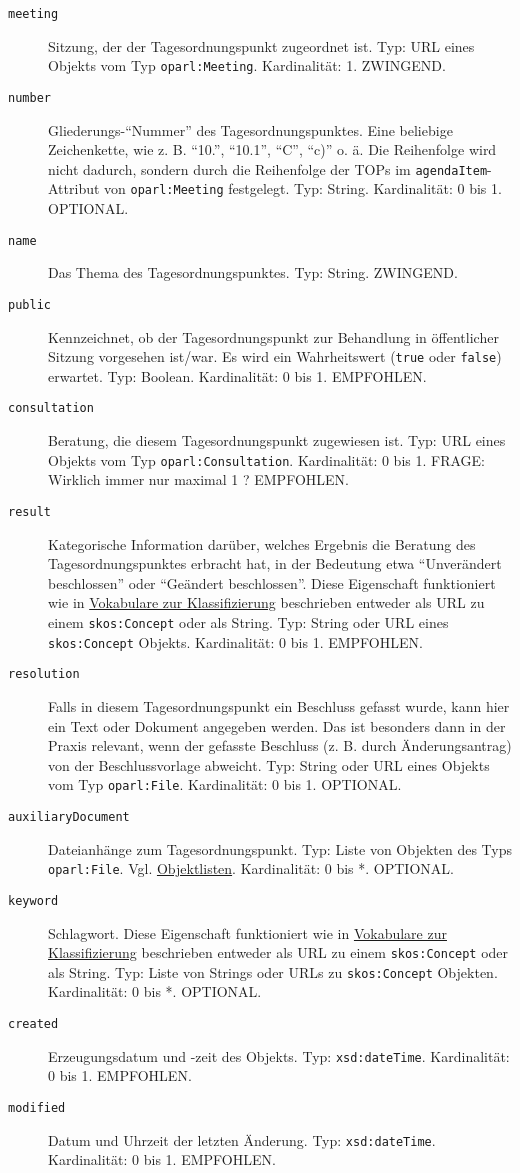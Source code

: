 \documentclass[,a4paper]{article}
\begin{document}
\begin{description}
\item[\texttt{meeting}]
Sitzung, der der Tagesordnungspunkt zugeordnet ist. Typ: URL eines
Objekts vom Typ \texttt{oparl:Meeting}. Kardinalität: 1. ZWINGEND.
\item[\texttt{number}]
Gliederungs-``Nummer'' des Tagesordnungspunktes. Eine beliebige
Zeichenkette, wie z. B. ``10.'', ``10.1'', ``C'', ``c)'' o. ä. Die
Reihenfolge wird nicht dadurch, sondern durch die Reihenfolge der TOPs
im \texttt{agendaItem}-Attribut von \texttt{oparl:Meeting} festgelegt.
Typ: String. Kardinalität: 0 bis 1. OPTIONAL.
\item[\texttt{name}]
Das Thema des Tagesordnungspunktes. Typ: String. ZWINGEND.
\item[\texttt{public}]
Kennzeichnet, ob der Tagesordnungspunkt zur Behandlung in öffentlicher
Sitzung vorgesehen ist/war. Es wird ein Wahrheitswert (\texttt{true}
oder \texttt{false}) erwartet. Typ: Boolean. Kardinalität: 0 bis 1.
EMPFOHLEN.
\item[\texttt{consultation}]
Beratung, die diesem Tagesordnungspunkt zugewiesen ist. Typ: URL eines
Objekts vom Typ \texttt{oparl:Consultation}. Kardinalität: 0 bis 1.
FRAGE: Wirklich immer nur maximal 1 ? EMPFOHLEN.
\item[\texttt{result}]
Kategorische Information darüber, welches Ergebnis die Beratung des
Tagesordnungspunktes erbracht hat, in der Bedeutung etwa ``Unverändert
beschlossen'' oder ``Geändert beschlossen''. Diese Eigenschaft
funktioniert wie in \hyperref[vokabulareux5fklassifizierung]{Vokabulare
zur Klassifizierung} beschrieben entweder als URL zu einem
\texttt{skos:Concept} oder als String. Typ: String oder URL eines
\texttt{skos:Concept} Objekts. Kardinalität: 0 bis 1. EMPFOHLEN.
\item[\texttt{resolution}]
Falls in diesem Tagesordnungspunkt ein Beschluss gefasst wurde, kann
hier ein Text oder Dokument angegeben werden. Das ist besonders dann in
der Praxis relevant, wenn der gefasste Beschluss (z. B. durch
Änderungsantrag) von der Beschlussvorlage abweicht. Typ: String oder URL
eines Objekts vom Typ \texttt{oparl:File}. Kardinalität: 0 bis 1.
OPTIONAL.
\item[\texttt{auxiliaryDocument}]
Dateianhänge zum Tagesordnungspunkt. Typ: Liste von Objekten des Typs
\texttt{oparl:File}. Vgl. \hyperref[objektlisten]{Objektlisten}.
Kardinalität: 0 bis *. OPTIONAL.
\item[\texttt{keyword}]
Schlagwort. Diese Eigenschaft funktioniert wie in
\hyperref[vokabulareux5fklassifizierung]{Vokabulare zur Klassifizierung}
beschrieben entweder als URL zu einem \texttt{skos:Concept} oder als
String. Typ: Liste von Strings oder URLs zu \texttt{skos:Concept}
Objekten. Kardinalität: 0 bis *. OPTIONAL.
\item[\texttt{created}]
Erzeugungsdatum und -zeit des Objekts. Typ: \texttt{xsd:dateTime}.
Kardinalität: 0 bis 1. EMPFOHLEN.
\item[\texttt{modified}]
Datum und Uhrzeit der letzten Änderung. Typ: \texttt{xsd:dateTime}.
Kardinalität: 0 bis 1. EMPFOHLEN.
\end{description}
\end{document}
